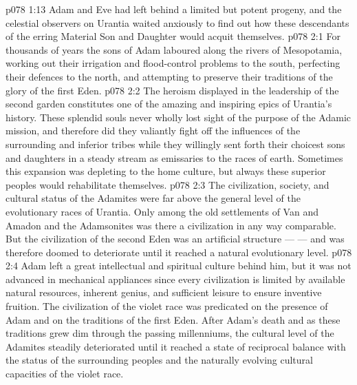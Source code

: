\vs p078 1:13 Adam and Eve had left behind a limited but potent progeny, and the celestial observers on Urantia waited anxiously to find out how these descendants of the erring Material Son and Daughter would acquit themselves.
\vs p078 2:1 For thousands of years the sons of Adam laboured along the rivers of Mesopotamia, working out their irrigation and flood\hyp{}control problems to the south, perfecting their defences to the north, and attempting to preserve their traditions of the glory of the first Eden.
\vs p078 2:2 The heroism displayed in the leadership of the second garden constitutes one of the amazing and inspiring epics of Urantia’s history. These splendid souls never wholly lost sight of the purpose of the Adamic mission, and therefore did they valiantly fight off the influences of the surrounding and inferior tribes while they willingly sent forth their choicest sons and daughters in a steady stream as emissaries to the races of earth. Sometimes this expansion was depleting to the home culture, but always these superior peoples would rehabilitate themselves.
\vs p078 2:3 The civilization, society, and cultural status of the Adamites were far above the general level of the evolutionary races of Urantia. Only among the old settlements of Van and Amadon and the Adamsonites was there a civilization in any way comparable. But the civilization of the second Eden was an artificial structure ---  ---  and was therefore doomed to deteriorate until it reached a natural evolutionary level.
\vs p078 2:4 Adam left a great intellectual and spiritual culture behind him, but it was not advanced in mechanical appliances since every civilization is limited by available natural resources, inherent genius, and sufficient leisure to ensure inventive fruition. The civilization of the violet race was predicated on the presence of Adam and on the traditions of the first Eden. After Adam’s death and as these traditions grew dim through the passing millenniums, the cultural level of the Adamites steadily deteriorated until it reached a state of reciprocal balance with the status of the surrounding peoples and the naturally evolving cultural capacities of the violet race.
